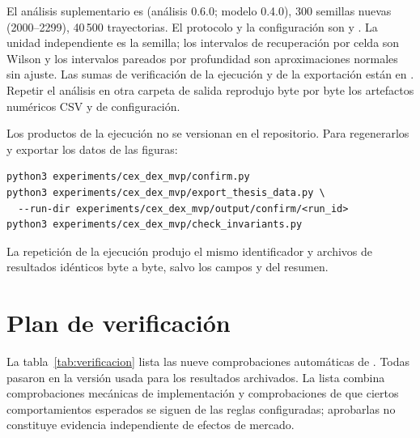 El análisis suplementario es  (análisis 0.6.0; modelo 0.4.0), 300 semillas nuevas (2000--2299), 40\,500 trayectorias. El protocolo y la configuración son  y . La unidad independiente es la semilla; los intervalos de recuperación por celda son Wilson y los intervalos pareados por profundidad son aproximaciones normales sin ajuste. Las sumas de verificación de la ejecución y de la exportación están en . Repetir el análisis en otra carpeta de salida reprodujo byte por byte los artefactos numéricos CSV y de configuración.

Los productos de la ejecución no se versionan en el repositorio. Para regenerarlos y exportar los datos de las figuras:

\begin{verbatim}
python3 experiments/cex_dex_mvp/confirm.py
python3 experiments/cex_dex_mvp/export_thesis_data.py \
  --run-dir experiments/cex_dex_mvp/output/confirm/<run_id>
python3 experiments/cex_dex_mvp/check_invariants.py
\end{verbatim}

La repetición de la ejecución produjo el mismo identificador y archivos de resultados idénticos byte a byte, salvo los campos  y  del resumen.

\section{Plan de verificación}
\label{sec:verificacion}

La tabla~\ref{tab:verificacion} lista las nueve comprobaciones automáticas de . Todas pasaron en la versión usada para los resultados archivados. La lista combina comprobaciones mecánicas de implementación y comprobaciones de que ciertos comportamientos esperados se siguen de las reglas configuradas; aprobarlas no constituye evidencia independiente de efectos de mercado.

